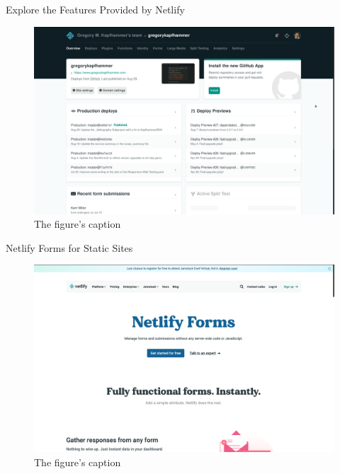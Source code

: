 \documentclass[14pt,aspectratio=169]{beamer}
\begin{document}
%
\begin{frame}{Explore the Features Provided by Netlify}
  \begin{figure}
    \centering
    \includegraphics[scale=.08]{images/netlifydashboard.png}
    \caption{The figure's caption}
  \end{figure}
\end{frame}

%
\begin{frame}{Netlify Forms for Static Sites}
  \begin{figure}
    \centering
    \includegraphics[scale=.08]{images/netlifyforms.png}
    \caption{The figure's caption}
  \end{figure}
\end{frame}
\end{document}
